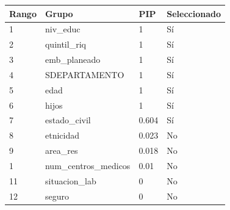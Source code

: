 \begin{tabular}{llll}
  \toprule
Rango & Grupo & PIP & Seleccionado \\ 
  \midrule
1 & niv\_educ & 1 & Sí \\ 
  2 & quintil\_riq & 1 & Sí \\ 
  3 & emb\_planeado & 1 & Sí \\ 
  4 & SDEPARTAMENTO & 1 & Sí \\ 
  5 & edad & 1 & Sí \\ 
  6 & hijos & 1 & Sí \\ 
  7 & estado\_civil & 0.604 & Sí \\ 
  8 & etnicidad & 0.023 & No \\ 
  9 & area\_res & 0.018 & No \\ 
  1 & num\_centros\_medicos & 0.01 & No \\ 
  11 & situacion\_lab & 0 & No \\ 
  12 & seguro & 0 & No \\ 
   \bottomrule
\end{tabular}
